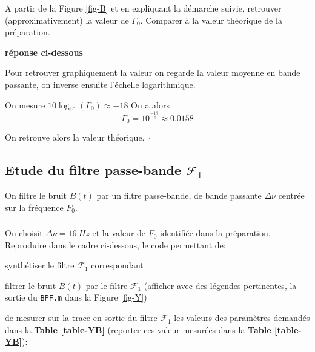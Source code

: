 \documentclass{article}
\newcommand{\dnu}{16}
\newcommand{\debutrep}[1]{\color{blue}\begin{center} \hrulefill \textbf{ #1 } \hrulefill \end{center} }
\newcommand{\finrep}{\vspace*{5mm}\hfill $\square$\color{black}\vspace*{5mm}}
\begin{document}
\begin{table}[H]
\begin{center}
\begin{tabular}{| L{40mm} | C{40mm}|}\hline
Moyenne $B(t)$ 		
& $-1.854294e-17}$ 	
\\[5mm] \hline
Variance $B(t)$
& $5$
\\[5mm] \hline
\end{tabular}
\end{center}
\label{table-B}
\caption{Mesures de la moyenne et de la variance de $B(t)$.}
\label{tab-B}
\end{table}



A partir  de la Figure \ref{fig-B} et en expliquant la démarche suivie, retrouver (approximativement) la valeur de $\Gamma_0$. Comparer à la valeur théorique de la préparation.

\debutrep{réponse ci-dessous}
Pour retrouver graphiquement la valeur on regarde la valeur moyenne en bande passante, on inverse ensuite l'échelle logarithmique.

On mesure $10\log_{10}(\Gamma_0)\approx -18$
On a alors
\[
\Gamma_0 = 10^{\frac{-18}{10}} \approx 0.0158
\]

On retrouve alors la valeur théorique.
\finrep

\subsection{Etude du filtre passe-bande $\mathcal{F}_1$}
\label{sec:bruit-passe-bande}

On filtre le bruit $B(t)$ par un filtre passe-bande, de bande passante  $\Delta\nu$ centrée sur  la fréquence  $F_0$. 

\subsubsection{}

On choisit $\Delta\nu = \dnu~Hz$ et la valeur de $F_0$ identifiée dans la préparation.  \\
Reproduire dans le cadre ci-dessous, le code permettant de:
\begin{list}{-}{\setlength{\leftmargin}{3mm} \setlength{\labelwidth}{20mm} \setlength{\labelsep}{2mm} \setlength{\itemsep}{1mm} }
\item synthétiser le filtre $\mathcal{F}_1$ correspondant
\item filtrer le bruit $B(t)$ par le filtre $\mathcal{F}_1$ (afficher avec des légendes pertinentes, la sortie du {\tt BPF.m} dans la Figure \ref{fig-Y}) 
\item de mesurer sur la trace en sortie du filtre $\mathcal{F}_1$ les valeurs des paramètres demandés dans la \textbf{Table  \ref{table-YB}} (reporter ces valeur mesurées dans la \textbf{Table \ref{table-YB}}):
\end{list}
\end{document}
